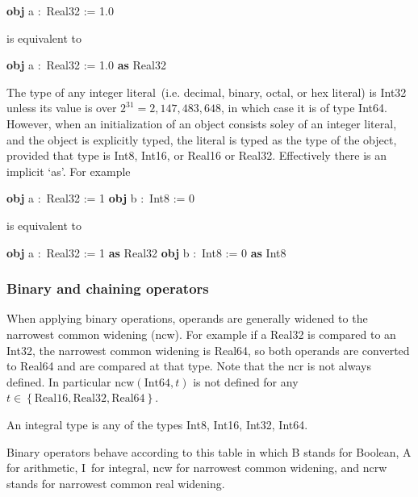 \documentclass{article}%
\begin{document}
\begin{code}
\textbf{obj} a :\ Real32 := 1.0
\end{code}

\noindent is equivalent to

\begin{code}
\textbf{obj} a :\ Real32 := 1.0 \textbf{as} Real32
\end{code}

The type of any integer literal\ (i.e. decimal, binary, octal, or hex literal)
is Int32 unless its value is over $2^{31}=2,147,483,648$, in which case it is
of type Int64. However, when an initialization of an object consists soley of
an integer literal, and the object is explicitly typed, the literal is typed
as the type of the object, provided that type is Int8, Int16, or Real16 or
Real32. Effectively there is an implicit `as'. For example

\begin{code}
\textbf{obj} a :\ Real32 := 1 \textbf{obj} b :\ Int8 := 0
\end{code}

\noindent is equivalent to

\begin{code}
\textbf{obj} a :\ Real32 := 1 \textbf{as} Real32 \textbf{obj} b :\ Int8 := 0
\textbf{as} Int8
\end{code}

\subsubsection{Binary and chaining operators}

When applying binary operations, operands are generally widened to the
narrowest common widening (ncw). For example if a Real32 is compared to an
Int32, the narrowest common widening is Real64, so both operands are converted
to Real64 and are compared at that type. Note that the ncr is not always
defined. In particular $\mathrm{ncw}(\mathrm{Int64},t)$ is not defined for any
$t\in\left\{  \mathrm{Real16},\mathrm{Real32},\mathrm{Real64}\right\}  $.

An integral type is any of the types Int8, Int16, Int32, Int64.

Binary operators behave according to this table in which B stands for Boolean,
A for arithmetic, I\ for integral, ncw for narrowest common widening, and ncrw
stands for narrowest common real widening.%
\end{document}
